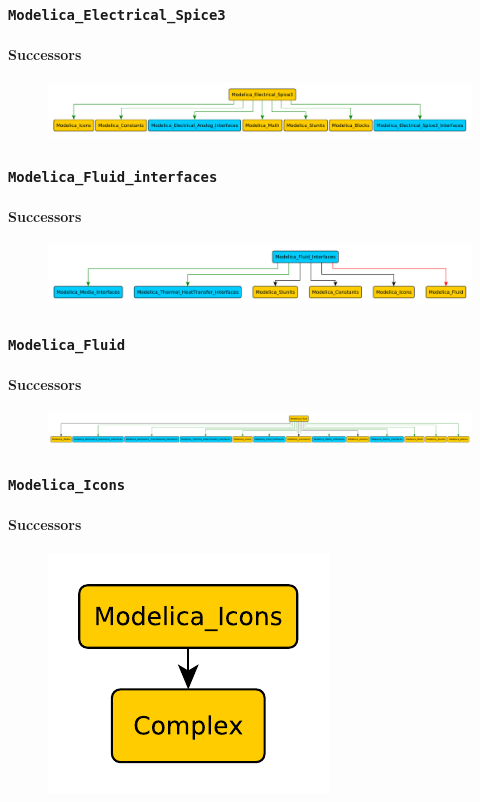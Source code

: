 \documentclass[aspectratio=1610]{beamer}
\begin{document}
\begin{frame}
  \frametitle{\texttt{Modelica\_Electrical\_Spice3}}
  \framesubtitle{Successors}
  \begin{figure}
      \includegraphics[width=\textwidth]{Modelica_Electrical_Spice3}
  \end{figure}
\end{frame}

\begin{frame}
  \frametitle{\texttt{Modelica\_Fluid\_interfaces}}
  \framesubtitle{Successors}
  \begin{figure}
      \includegraphics[width=\textwidth]{Modelica_Fluid_interfaces}
  \end{figure}
\end{frame}

\begin{frame}
  \frametitle{\texttt{Modelica\_Fluid}}
  \framesubtitle{Successors}
  \begin{figure}
      \includegraphics[width=\textwidth]{Modelica_Fluid}
  \end{figure}
\end{frame}

\begin{frame}
  \frametitle{\texttt{Modelica\_Icons}}
  \framesubtitle{Successors}
  \begin{figure}
      \includegraphics[width=\textwidth]{Modelica_Icons}
  \end{figure}
\end{frame}
\end{document}
